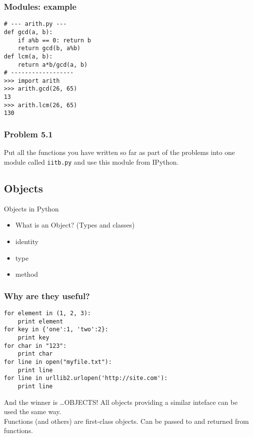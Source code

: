 \documentclass[14pt,compress]{beamer}
\newcounter{time}
\newcommand{\inctime}[1]{\addtocounter{time}{#1}{\tiny \thetime\ m}}
\newcommand{\typ}[1]{\texttt{#1}}
\begin{document}
\begin{frame}[fragile]
  \frametitle{Modules: example}
  \begin{lstlisting}
# --- arith.py ---
def gcd(a, b):
    if a%b == 0: return b
    return gcd(b, a%b)
def lcm(a, b):
    return a*b/gcd(a, b)
# ------------------
>>> import arith
>>> arith.gcd(26, 65)
13
>>> arith.lcm(26, 65)
130
  \end{lstlisting}
\end{frame}

\begin{frame}[fragile]
  \frametitle{Problem 5.1}

  Put all the functions you have written so far as part of the problems
  into one module called \typ{iitb.py} and use this module from IPython.

\inctime{20}
\end{frame}

\subsection{Objects}
\begin{frame}{Objects in Python}
    \begin{itemize}
        \item What is an Object? (Types and classes)
        \item identity
        \item type
        \item method
      \end{itemize}
\end{frame}

\begin{frame}[fragile]
  \frametitle{Why are they useful?}
  \small
  \begin{lstlisting}
for element in (1, 2, 3):
    print element
for key in {'one':1, 'two':2}:
    print key
for char in "123":
    print char
for line in open("myfile.txt"):
    print line
for line in urllib2.urlopen('http://site.com'):
    print line
  \end{lstlisting}
\end{frame}

\begin{frame}{And the winner is \ldots OBJECTS!}
  All objects providing a similar inteface can be used the same way.\\
  Functions (and others) are first-class objects. Can be passed to and returned from functions.
  \inctime{10}
\end{frame}
\end{document}
